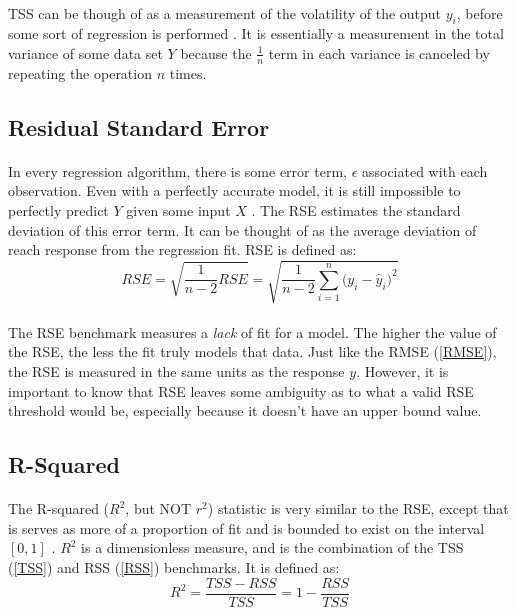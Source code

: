 \documentclass[12pt,letterpaper]{article}
\begin{document}
\paragraph*{}TSS can be though of as a measurement of the volatility of the output $y_i$, before some sort of regression is performed \cite{James}. It is essentially a measurement in the total variance of some data set $Y$ because the $\frac{1}{n}$ term in each variance is canceled by repeating the operation $n$ times.


\subsection{Residual Standard Error}
\paragraph*{}In every regression algorithm, there is some error term, $\epsilon$ associated with each observation. Even with a perfectly accurate model, it is still impossible to perfectly predict $Y$ given some input $X$ \cite{James}. The RSE estimates the standard deviation of this error term.  It can be thought of as the average deviation of reach response from the regression fit. RSE is defined as:
\begin{equation}
RSE = \sqrt{\frac{1}{n-2}RSE} = 
\sqrt{\frac{1}{n-2}\sum_{i=1}^n \big(y_i - \hat{y}_i \big)^2}
\end{equation}
\paragraph*{}The RSE benchmark measures a \textit{lack} of fit for a model. The higher the value of the RSE, the less the fit truly models that data. Just like the RMSE (\ref{RMSE}), the RSE is measured in the same units as the response 
$y$. However, it is important to know that RSE leaves some ambiguity as to what a valid RSE threshold would be, especially because it  doesn't have an  upper bound value.



\subsection{R-Squared}
\paragraph*{}The R-squared ($R^2$, but NOT $r^2$) statistic is very similar to the RSE, except that is serves as more of a proportion of fit and is bounded to exist on the interval $[0,1]$ \cite{James}. $R^2$ is a dimensionless measure, and is the combination of the TSS (\ref{TSS}) and RSS (\ref{RSS}) benchmarks. It is defined as:
\begin{equation}
\label{R-sq}
R^2 = \frac{TSS - RSS}{TSS} = 1 - \frac{RSS}{TSS}
\end{equation}
\end{document}
